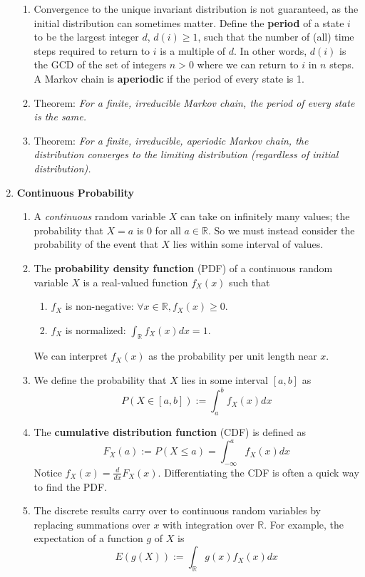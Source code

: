 \documentclass[10pt]{article}
\begin{document}
\begin{multicols}{2}
\begin{enumerate}
\begin{enumerate}
            \item Convergence to the unique invariant distribution is not guaranteed, as the initial distribution can sometimes matter. Define the \textbf{period} of a state $i$ to be the largest integer $d$, $d(i) \geq 1$, such that the number of (all) time steps required to return to $i$ is a multiple of $d$. In other words, $d(i)$ is the GCD of the set of integers $n>0$ where we can return to $i$ in $n$ steps. A Markov chain is \textbf{aperiodic} if the period of every state is 1.
            \item Theorem: \textit{For a finite, irreducible Markov chain, the period of every state is the same.}
            \item Theorem: \textit{For a finite, irreducible, aperiodic Markov chain, the distribution converges to the limiting distribution (regardless of initial distribution).}
        \end{enumerate}
        \item \textbf{Continuous Probability}
        \begin{enumerate}
            \item A \textit{continuous} random variable $X$ can take on infinitely many values; the probability that $X=a$ is 0 for all $a \in \mathbb{R}$. So we must instead consider the probability of the event that $X$ lies within some interval of values.
            \item The \textbf{probability density function} (PDF) of a continuous random variable $X$ is a real-valued function $f_X(x)$ such that 
            \begin{enumerate}
                \item $f_X$ is non-negative: $\forall x \in \mathbb{R}, f_X(x) \geq 0$.
                \item $f_X$ is normalized: $\int_{\mathbb{R}} f_X(x) dx=1$.
            \end{enumerate}
            We can interpret $f_X(x)$ as the probability per unit length near $x$.
            \item We define the probability that $X$ lies in some interval $[a,b]$ as $$P(X \in [a,b]) := \int_a^b f_X(x) dx$$
            \item The \textbf{cumulative distribution function} (CDF) is defined as $$F_X(a) := P(X \leq a) = \int_{-\infty}^a f_X(x)dx$$ 
            Notice $f_X(x)=\frac{d}{dx}F_X(x)$. Differentiating the CDF is often a quick way to find the PDF.
            \item The discrete results carry over to continuous random variables by replacing summations over $x$ with integration over $\mathbb{R}$. For example, the expectation of a function $g$ of $X$ is $$E(g(X)):= \int_{\mathbb{R}} g(x)f_X(x)dx$$ 

\end{enumerate}
\end{enumerate}
\end{multicols}
\end{document}

